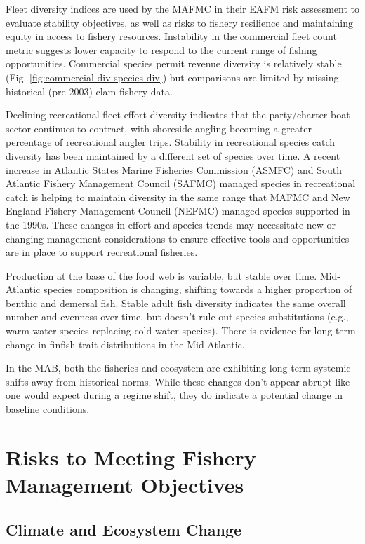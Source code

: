 \documentclass[
  10pt,
]{article}
\begin{document}
Fleet diversity indices are used by the MAFMC in their EAFM risk assessment to evaluate stability objectives, as well as risks to fishery resilience and maintaining equity in access to fishery resources. Instability in the commercial fleet count metric suggests lower capacity to respond to the current range of fishing opportunities. Commercial species permit revenue diversity is relatively stable (Fig. \ref{fig:commercial-div-species-div}) but comparisons are limited by missing historical (pre-2003) clam fishery data.

Declining recreational fleet effort diversity indicates that the party/charter boat sector continues to contract, with shoreside angling becoming a greater percentage of recreational angler trips. Stability in recreational species catch diversity has been maintained by a different set of species over time. A recent increase in Atlantic States Marine Fisheries Commission (ASMFC) and South Atlantic Fishery Management Council (SAFMC) managed species in recreational catch is helping to maintain diversity in the same range that MAFMC and New England Fishery Management Council (NEFMC) managed species supported in the 1990s. These changes in effort and species trends may necessitate new or changing management considerations to ensure effective tools and opportunities are in place to support recreational fisheries.

Production at the base of the food web is variable, but stable over time. Mid-Atlantic species composition is changing, shifting towards a higher proportion of benthic and demersal fish. Stable adult fish diversity indicates the same overall number and evenness over time, but doesn't rule out species substitutions (e.g., warm-water species replacing cold-water species). There is evidence for long-term change in finfish trait distributions in the Mid-Atlantic.

In the MAB, both the fisheries and ecosystem are exhibiting long-term systemic shifts away from historical norms. While these changes don't appear abrupt like one would expect during a regime shift, they do indicate a potential change in baseline conditions.

\newpage

\section{Risks to Meeting Fishery Management Objectives}\label{risks-to-meeting-fishery-management-objectives}

\subsection{Climate and Ecosystem Change}\label{climate-and-ecosystem-change}
\end{document}

